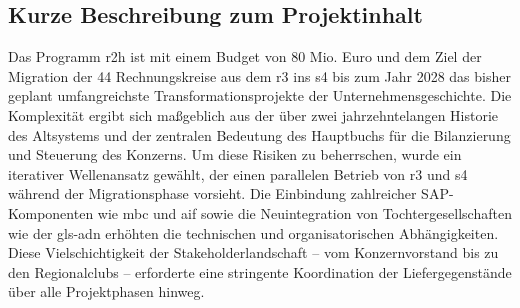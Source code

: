 \subsection{Kurze Beschreibung zum Projektinhalt}
\label{subsec:Projektbeschreibung}

\par Das Programm \gls{r2h} ist mit einem Budget von 80 Mio. Euro und dem Ziel der Migration der 44 Rechnungskreise aus dem \gls{r3} ins \gls{s4} bis zum Jahr 2028 das bisher geplant umfangreichste Transformationsprojekte der Unternehmensgeschichte. Die Komplexität ergibt sich maßgeblich aus der über zwei jahrzehntelangen Historie des Altsystems und der zentralen Bedeutung des Hauptbuchs für die Bilanzierung und Steuerung des Konzerns. Um diese Risiken zu beherrschen, wurde ein iterativer Wellenansatz gewählt, der einen parallelen Betrieb von \gls{r3} und \gls{s4} während der Migrationsphase vorsieht. Die Einbindung zahlreicher SAP-Komponenten wie \gls{mbc} und \gls{aif} sowie die Neuintegration von Tochtergesellschaften wie der \gls{gls-adn} erhöhten die technischen und organisatorischen Abhängigkeiten. Diese Vielschichtigkeit der Stakeholderlandschaft – vom Konzernvorstand bis zu den Regionalclubs – erforderte eine stringente Koordination der Liefergegenstände über alle Projektphasen hinweg.


